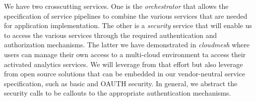 We have two crosscutting services. One is the {\em orchestrator} that
allows the specification of service pipelines to combine the various
services that are needed for application implementation. The other
is a {\em security} service that will enable us to access the various services
through the required authentication and authorization mechanisms. The
latter we have demonstrated in {\em cloudmesh} where users can manage their
own access to a multi-cloud environment ta access their activated
analytics services. We will leverage from that effort but  also leverage from
open source solutions that can be embedded in our vendor-neutral
service specification, such as basic and OAUTH security. In general, we
abstract the security calls to be callouts to the appropriate
authentication mechanisms.

